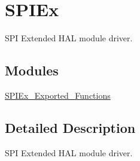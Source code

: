 \hypertarget{group___s_p_i_ex}{}\section{S\+P\+I\+Ex}
\label{group___s_p_i_ex}


S\+PI Extended H\+AL module driver.  


\subsection*{Modules}
\begin{DoxyCompactItemize}
\item 
\mbox{\hyperlink{group___s_p_i_ex___exported___functions}{S\+P\+I\+Ex\+\_\+\+Exported\+\_\+\+Functions}}
\end{DoxyCompactItemize}


\subsection{Detailed Description}
S\+PI Extended H\+AL module driver. 

